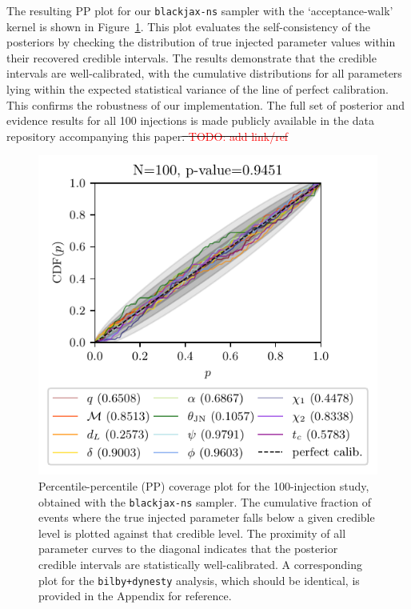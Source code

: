 \documentclass[fleqn,usenatbib]{mnras}
\providecommand{\DIFadd}[1]{{\protect\color{blue}\uwave{#1}}} %
\providecommand{\DIFdel}[1]{{\protect\color{red}\sout{#1}}}                      %
\providecommand{\DIFaddbegin}{} %
\providecommand{\DIFaddend}{} %
\providecommand{\DIFdelbegin}{} %
\providecommand{\DIFdelend}{} %
\newcommand{\DIFscaledelfig}{0.5}
\newlength{\DIFdelgraphicswidth} %
\newlength{\DIFdelgraphicsheight} %
\newcommand{\DIFaddincludegraphics}[2][]{{\color{blue}\fbox{\DIFOincludegraphics[#1]{#2}}}} %
\newcommand{\DIFdelincludegraphics}[2][]{%
\sbox{\DIFdelgraphicsbox}{\DIFOincludegraphics[#1]{#2}}%
\settoboxwidth{\DIFdelgraphicswidth}{\DIFdelgraphicsbox} %
\settoboxtotalheight{\DIFdelgraphicsheight}{\DIFdelgraphicsbox} %
\scalebox{\DIFscaledelfig}{%
\parbox[b]{\DIFdelgraphicswidth}{\usebox{\DIFdelgraphicsbox}\\[-\baselineskip] \rule{\DIFdelgraphicswidth}{0em}}\llap{\resizebox{\DIFdelgraphicswidth}{\DIFdelgraphicsheight}{%
\setlength{\unitlength}{\DIFdelgraphicswidth}%
\begin{picture}(1,1)%
\thicklines\linethickness{2pt} %
{\color[rgb]{1,0,0}\put(0,0){\framebox(1,1){}}}%
{\color[rgb]{1,0,0}\put(0,0){\line( 1,1){1}}}%
{\color[rgb]{1,0,0}\put(0,1){\line(1,-1){1}}}%
\end{picture}%
}\hspace*{3pt}}} %
} %
\DeclareRobustCommand{\DIFaddbegin}{\DIFOaddbegin \let\includegraphics\DIFaddincludegraphics} %
\DeclareRobustCommand{\DIFaddend}{\DIFOaddend \let\includegraphics\DIFOincludegraphics} %
\DeclareRobustCommand{\DIFdelbegin}{\DIFOdelbegin \let\includegraphics\DIFdelincludegraphics} %
\DeclareRobustCommand{\DIFdelend}{\DIFOaddend \let\includegraphics\DIFOincludegraphics} %
\begin{document}
The resulting PP plot for our \texttt{blackjax-ns} sampler
with the `acceptance-walk' kernel is shown in Figure~\ref{fig:pp_coverage}.
This plot evaluates the self-consistency of the posteriors by checking
the distribution of true injected parameter values within their
recovered credible intervals. The results demonstrate that the credible
intervals are well-calibrated, with the cumulative distributions for all
parameters lying within the expected statistical variance of the
line of perfect calibration. This confirms the robustness of our implementation. The full
set of posterior and evidence results for all 100 injections is made
publicly available in the data repository accompanying this paper\DIFdelbegin \DIFdel{.
\textcolor{red}{TODO: add link/ref}
}\DIFdelend \DIFaddbegin \DIFadd{~\mbox{%
\citep{Prathaban_2025_zenodo}}\hskip0pt%
.
}\DIFaddend 

\begin{figure}
    \centering
    \includegraphics[width=\columnwidth]{figures/pp_coverage_blackjax.pdf}
    \caption{Percentile-percentile (PP) coverage plot for the
    100-injection study, obtained with the \texttt{blackjax-ns}
    sampler. The cumulative fraction of events where the true
    injected parameter falls below a given credible level is plotted
    against that credible level. The proximity of all parameter curves
    to the diagonal indicates that the posterior credible intervals
    are statistically well-calibrated. A corresponding plot for the
    \texttt{bilby+dynesty} analysis, which should be identical,
    is provided in the Appendix for reference.}
    \label{fig:pp_coverage}
\end{figure}
\end{document}
